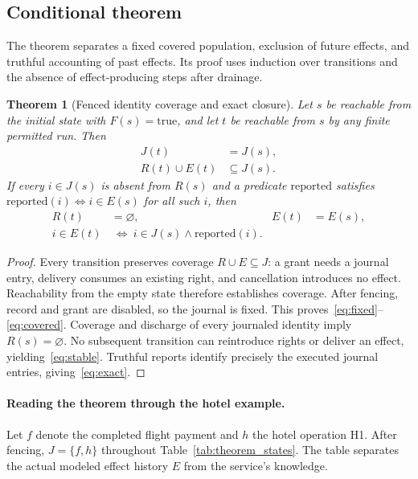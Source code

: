 \documentclass[11pt]{article}
\newtheorem{theorem}{Theorem}
\begin{document}
\subsection{Conditional theorem}
The theorem separates a fixed covered population, exclusion of future effects,
and truthful accounting of past effects. Its proof uses induction over
transitions and the absence of effect-producing steps after drainage.
\begin{theorem}[Fenced identity coverage and exact closure]
Let $s$ be reachable from the initial state with $F(s)=\mathrm{true}$, and let
$t$ be reachable from $s$ by any finite permitted run. Then
\begin{align}
J(t)&=J(s),\label{eq:fixed}\\
R(t)\cup E(t)&\subseteq J(s).\label{eq:covered}
\end{align}
If every $i\in J(s)$ is absent from $R(s)$ and a predicate $\mathrm{reported}$
satisfies $\mathrm{reported}(i)\Leftrightarrow i\in E(s)$ for all such $i$, then
\begin{align}
R(t)&=\varnothing,& E(t)&=E(s),\label{eq:stable}\\
i\in E(t)&\ \Longleftrightarrow\ i\in J(s)\land\mathrm{reported}(i).
\label{eq:exact}
\end{align}
\end{theorem}

\begin{proof}
Every transition preserves coverage $R\cup E\subseteq J$: a grant needs a
journal entry, delivery consumes an existing right, and cancellation introduces
no effect. Reachability from the empty state therefore establishes coverage.
After fencing, record and grant are disabled, so the journal is fixed. This
proves~\eqref{eq:fixed}--\eqref{eq:covered}. Coverage and discharge of every
journaled identity imply $R(s)=\varnothing$. No subsequent transition can
reintroduce rights or deliver an effect, yielding~\eqref{eq:stable}. Truthful
reports identify precisely the executed journal entries, giving~\eqref{eq:exact}.
\end{proof}

\paragraph{Reading the theorem through the hotel example.}
Let $f$ denote the completed flight payment and $h$ the hotel operation H1.
After fencing, $J=\{f,h\}$ throughout Table~\ref{tab:theorem_states}. The table
separates the actual modeled effect history $E$ from the service's knowledge.
\end{document}
